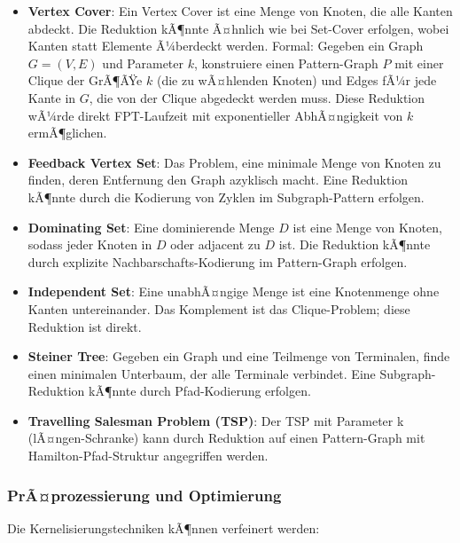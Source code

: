 ﻿\documentclass[a4paper,12pt]{article}
\theoremstyle{definition}
\begin{document}
\begin{itemize}
	\item \textbf{Vertex Cover}: Ein Vertex Cover ist eine Menge von Knoten, die alle Kanten abdeckt. Die Reduktion kÃ¶nnte Ã¤hnlich wie bei Set-Cover erfolgen, wobei Kanten statt Elemente Ã¼berdeckt werden. Formal: Gegeben ein Graph $G = (V,E)$ und Parameter $k$, konstruiere einen Pattern-Graph $P$ mit einer Clique der GrÃ¶ÃŸe $k$ (die zu wÃ¤hlenden Knoten) und Edges fÃ¼r jede Kante in $G$, die von der Clique abgedeckt werden muss. Diese Reduktion wÃ¼rde direkt FPT-Laufzeit mit exponentieller AbhÃ¤ngigkeit von $k$ ermÃ¶glichen.
	
	\item \textbf{Feedback Vertex Set}: Das Problem, eine minimale Menge von Knoten zu finden, deren Entfernung den Graph azyklisch macht. Eine Reduktion kÃ¶nnte durch die Kodierung von Zyklen im Subgraph-Pattern erfolgen.
	
	\item \textbf{Dominating Set}: Eine dominierende Menge $D$ ist eine Menge von Knoten, sodass jeder Knoten in $D$ oder adjacent zu $D$ ist. Die Reduktion kÃ¶nnte durch explizite Nachbarschafts-Kodierung im Pattern-Graph erfolgen.
	
	\item \textbf{Independent Set}: Eine unabhÃ¤ngige Menge ist eine Knotenmenge ohne Kanten untereinander. Das Komplement ist das Clique-Problem; diese Reduktion ist direkt.
	
	\item \textbf{Steiner Tree}: Gegeben ein Graph und eine Teilmenge von Terminalen, finde einen minimalen Unterbaum, der alle Terminale verbindet. Eine Subgraph-Reduktion kÃ¶nnte durch Pfad-Kodierung erfolgen.
	
	\item \textbf{Travelling Salesman Problem (TSP)}: Der TSP mit Parameter k (lÃ¤ngen-Schranke) kann durch Reduktion auf einen Pattern-Graph mit Hamilton-Pfad-Struktur angegriffen werden.
\end{itemize}

\subsubsection{PrÃ¤prozessierung und Optimierung}

Die Kernelisierungstechniken kÃ¶nnen verfeinert werden:
\end{document}
